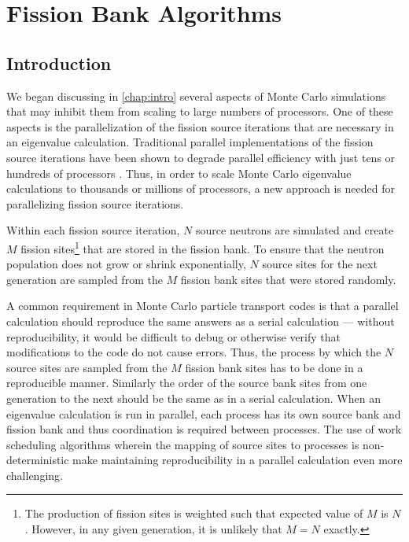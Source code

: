 \chapter{Fission Bank Algorithms}
\label{chap:fission-bank}

\section{Introduction}

We began discussing in \autoref{chap:intro} several aspects of Monte Carlo
simulations that may inhibit them from scaling to large numbers of
processors. One of these aspects is the parallelization of the fission source
iterations that are necessary in an eigenvalue calculation. Traditional parallel
implementations of the fission source iterations have been shown to degrade
parallel efficiency with just tens or hundreds of processors
\cite{physor-hoogenboom-2012}. Thus, in order to scale Monte Carlo eigenvalue
calculations to thousands or millions of processors, a new approach is needed
for parallelizing fission source iterations.

Within each fission source iteration, $N$ source neutrons are simulated and
create $M$ fission sites\footnote{The production of fission sites is weighted
  such that expected value of $M$ is $N$. However, in any given generation, it
  is unlikely that $M=N$ exactly.} that are stored in the fission bank. To
ensure that the neutron population does not grow or shrink exponentially, $N$
source sites for the next generation are sampled from the $M$ fission bank sites
that were stored randomly.

A common requirement in Monte Carlo particle transport codes is that a parallel
calculation should reproduce the same answers as a serial calculation ---
without reproducibility, it would be difficult to debug or otherwise verify that
modifications to the code do not cause errors. Thus, the process by which the
$N$ source sites are sampled from the $M$ fission bank sites has to be done in a
reproducible manner. Similarly the order of the source bank sites from one
generation to the next should be the same as in a serial calculation. When an
eigenvalue calculation is run in parallel, each process has its own source bank
and fission bank and thus coordination is required between processes. The use of
work scheduling algorithms wherein the mapping of source sites to processes is
non-deterministic make maintaining reproducibility in a parallel calculation
even more challenging.

